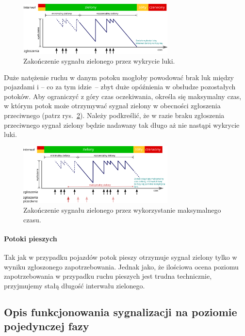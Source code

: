 \documentclass{pracamgr}
\newcommand{\imgr}[1]{rys.~\ref{#1}}
\theoremstyle{plain}
\begin{document}
\begin{figure}[h] \centering
  \includegraphics[width=0.7\textwidth]{img/signals-gap-out}
  \caption{Zakończenie sygnału zielonego przez wykrycie luki.}
\label{img:gap-out}
\end{figure}

Duże natężenie ruchu w danym potoku mogłoby powodować brak luk między
pojazdami i -- co za tym idzie~-- zbyt duże opóźnienia w obsłudze
pozostałych potoków. Aby ograniczyć z góry czas oczekiwania, określa
się maksymalny czas, w którym potok może otrzymywać sygnał zielony w
obecności zgłoszenia przeciwnego (patrz \imgr{img:max-out}). Należy
podkreślić, że w razie braku zgłoszenia przeciwnego sygnał zielony
będzie nadawany tak długo aż nie nastąpi wykrycie luki.
\begin{figure}[h] \centering
  \includegraphics[width=0.7\textwidth]{img/signals-max-out}
  \caption{Zakończenie sygnału zielonego przez wykorzystanie
maksymalnego czasu.}
\label{img:max-out}
\end{figure}

\paragraph{Potoki pieszych} Tak jak w przypadku pojazdów potok pieszy
otrzymuje sygnał zielony tylko w wyniku zgłoszonego
zapotrzebowania. Jednak jako, że ilościowa ocena poziomu
zapotrzebowania w przypadku ruchu pieszych jest trudna technicznie,
przyjmujemy stałą długość interwału zielonego.

\subsection{Opis funkcjonowania sygnalizacji na poziomie pojedynczej
fazy}
\end{document}
